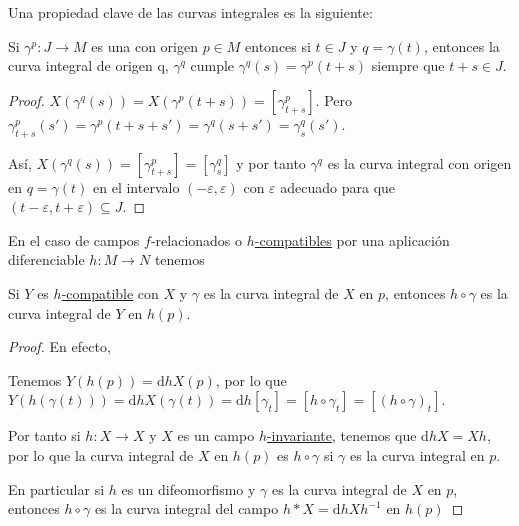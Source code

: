 \documentclass[../VD_completo.tex]{subfiles}
\begin{document}
Una propiedad clave de las curvas integrales es la siguiente:

\begin{lemma}
  \label{lem:ci-traslacion}
  Si \(\gamma^{p} \colon J \to M\) es una  con
  origen \(p \in M\) entonces si \(t \in J\) y \(q = \gamma(t)\), entonces la
  curva integral de origen q, \(\gamma^{q}\) cumple \(\gamma^{q}(s) =
  \gamma^{p}(t+s)\) siempre que \(t + s \in J\).
\end{lemma}

\begin{proof}
  \(X(\gamma^{q}(s)) = X(\gamma^{p}(t+s)) = [\gamma^{p}_{t+s}]\). Pero
  \(\gamma^{p}_{t+s}(s') = \gamma^{p}(t+s+s') = \gamma^{q}(s+s') =
  \gamma^{q}_{s}(s')\).

  Así, \(X(\gamma^{q}(s)) = [\gamma^{p}_{t+s}] = [\gamma^{q}_{s}]\) y por tanto
  \(\gamma^{q}\) es la curva integral con origen en \(q = \gamma(t)\) en el
  intervalo \((-\varepsilon, \varepsilon)\) con \(\varepsilon\) adecuado para
  que \((t - \varepsilon, t + \varepsilon) \subseteq J\).
\end{proof}

En el caso de campos \(f\)-relacionados o
\hyperref[def:f-comp]{\(h\)-compatibles}
por una aplicación diferenciable \(h \colon M \to N\) tenemos

\begin{lemma}
  Si \(Y\) es \hyperref[def:f-comp]{\(h\)-compatible} con \(X\) y \(\gamma\) es
  la curva integral de \(X\) en \(p\), entonces \(h \circ \gamma\) es la curva
  integral de \(Y\) en \(h(p)\).
\end{lemma}

\begin{proof}
  En efecto,

  \begin{centering}
  \end{centering}

  Tenemos \(Y(h(p)) = \mathrm{d} h X(p)\), por lo que \(Y(h(\gamma(t))) =
  \mathrm{d} h X(\gamma(t)) = \mathrm{d} h [\gamma_{t}] = [h \circ \gamma_{t}] =
  [ (h \circ \gamma)_{t}]\).

  Por tanto si \(h \colon X \to X\) y \(X\) es un campo
  \hyperref[def:f-invariante]{\(h\)-invariante}, tenemos que \(\mathrm{d} h X =
  X h\), por lo que la curva integral de \(X\) en \(h(p)\) es \(h \circ \gamma\)
  si \(\gamma\) es la curva integral en \(p\).

  En particular si \(h\) es un difeomorfismo y \(\gamma\) es la curva integral
  de \(X\) en \(p\), entonces \(h \circ \gamma\) es la curva integral del campo
  \(h * X = \mathrm{d} h X h^{-1}\) en \(h(p)\)
\end{proof}
\end{document}

